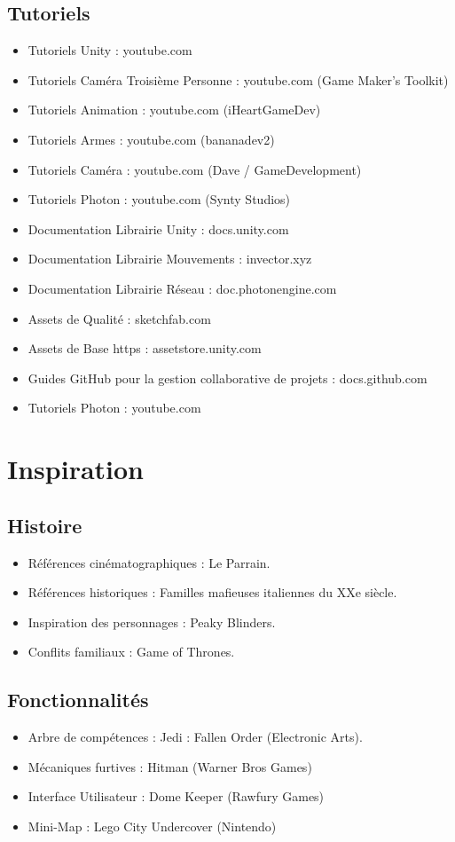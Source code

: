 \documentclass{report}
\begin{document}
\subsection{Tutoriels}
\begin{itemize}
    \item Tutoriels Unity : youtube.com
    \item Tutoriels Caméra Troisième Personne : youtube.com (Game Maker's Toolkit)
    \item Tutoriels Animation : youtube.com (iHeartGameDev)
    \item Tutoriels Armes : youtube.com (bananadev2)
    \item Tutoriels Caméra : youtube.com (Dave / GameDevelopment)
    \item Tutoriels Photon : youtube.com (Synty Studios)
    \item Documentation Librairie Unity : docs.unity.com 
    \item Documentation Librairie Mouvements : invector.xyz
    \item Documentation Librairie Réseau : doc.photonengine.com
    \item Assets de Qualité : sketchfab.com
    \item Assets de Base https : assetstore.unity.com
    \item Guides GitHub pour la gestion collaborative de projets : docs.github.com
    \item Tutoriels Photon : youtube.com
\end{itemize}

\newpage
\section{Inspiration}
\subsection{Histoire}
\begin{itemize}
    \item Références cinématographiques : Le Parrain.
    \item Références historiques : Familles mafieuses italiennes du XXe siècle.
    \item Inspiration des personnages : Peaky Blinders.
    \item Conflits familiaux : Game of Thrones.
\end{itemize}

\subsection{Fonctionnalités}
\begin{itemize}
    \item Arbre de compétences : Jedi : Fallen Order (Electronic Arts).
    \item Mécaniques furtives : Hitman (Warner Bros Games)
    \item Interface Utilisateur : Dome Keeper (Rawfury Games)
    \item Mini-Map : Lego City Undercover (Nintendo)
    
\end{itemize}
\end{document}
